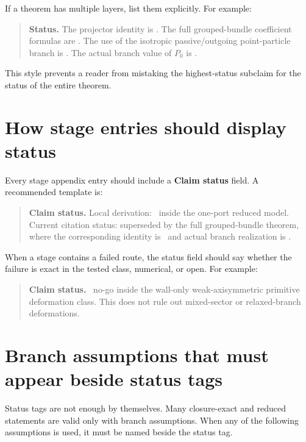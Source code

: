 If a theorem has multiple layers, list them explicitly.  For example:
\begin{quote}
\textbf{Status.}  The projector identity is \StatusExact.  The full grouped-bundle coefficient formulas are \StatusExactClosure.  The use of the isotropic passive/outgoing point-particle branch is \StatusReduced.  The actual branch value of \(P_0\) is \StatusOpen.
\end{quote}

This style prevents a reader from mistaking the highest-status subclaim for the status of the entire theorem.

\section{How stage entries should display status}
\label{sec:how-stage-entries-display-status}

Every stage appendix entry should include a \textbf{Claim status} field.  A recommended template is:
\begin{quote}
\textbf{Claim status.}  Local derivation: \StatusExactClosure\ inside the one-port reduced model.  Current citation status: superseded by the full grouped-bundle theorem, where the corresponding identity is \StatusExactClosure\ and actual branch realization is \StatusOpen.
\end{quote}

When a stage contains a failed route, the status field should say whether the failure is exact in the tested class, numerical, or open.  For example:
\begin{quote}
\textbf{Claim status.}  \StatusExactClosure\ no-go inside the wall-only weak-axisymmetric primitive deformation class.  This does not rule out mixed-sector or relaxed-branch deformations.
\end{quote}

\section{Branch assumptions that must appear beside status tags}
\label{sec:branch-assumptions-beside-status}

Status tags are not enough by themselves.  Many closure-exact and reduced statements are valid only with branch assumptions.  When any of the following assumptions is used, it must be named beside the status tag.

